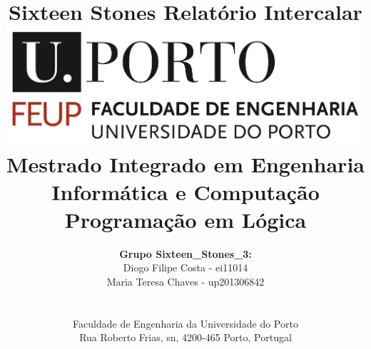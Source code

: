 \documentclass[a4paper]{article}
\begin{document}
\setlength{\textwidth}{16cm}
\setlength{\textheight}{22cm}

\title{\Huge\textbf{Sixteen Stones}\linebreak\linebreak\linebreak
\Large\textbf{Relatório Intercalar}\linebreak\linebreak
\linebreak\linebreak
\includegraphics[scale=0.1]{feup-logo.png}\linebreak\linebreak
\linebreak\linebreak
\Large{Mestrado Integrado em Engenharia Informática e Computação} \linebreak\linebreak
\Large{Programação em Lógica}\linebreak
}

\author{\textbf{Grupo Sixteen\_Stones\_3:}\\
Diogo Filipe Costa - ei11014 \\
Maria Teresa Chaves - up201306842 \\
\linebreak\linebreak \\
 \\ Faculdade de Engenharia da Universidade do Porto \\ Rua Roberto Frias, s\/n, 4200-465 Porto, Portugal \linebreak\linebreak\linebreak
\linebreak\linebreak\vspace{1cm}}

\maketitle
\thispagestyle{empty}
\end{document}
